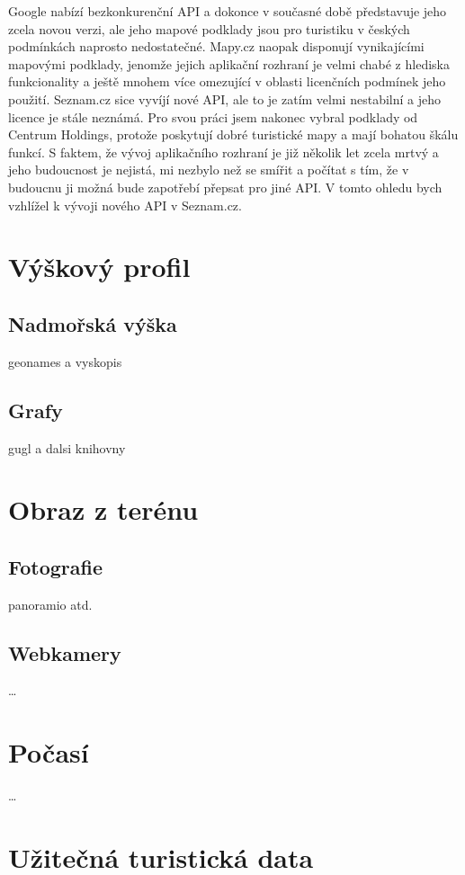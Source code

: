 Google nabízí bezkonkurenční API a dokonce v současné době
představuje jeho zcela novou verzi, ale jeho mapové podklady jsou pro turistiku v
českých podmínkách naprosto nedostatečné. Mapy.cz naopak disponují
vynikajícími mapovými podklady, jenomže jejich aplikační rozhraní je
velmi chabé z hlediska funkcionality a ještě mnohem více omezující v
oblasti licenčních podmínek jeho použití. Seznam.cz sice vyvíjí nové
API, ale to je zatím velmi nestabilní a jeho licence je stále
neznámá. Pro svou práci jsem nakonec vybral podklady od Centrum
Holdings, protože poskytují dobré turistické mapy a mají bohatou
škálu funkcí. S faktem, že vývoj aplikačního rozhraní je již několik
let zcela mrtvý a jeho budoucnost je nejistá, mi nezbylo než se
smířit a počítat s tím, že v budoucnu ji možná bude zapotřebí přepsat
pro jiné API. V tomto ohledu bych vzhlížel k vývoji nového API v Seznam.cz.




\section{Výškový profil}
\subsection{Nadmořská výška}
geonames a vyskopis
\subsection{Grafy}
gugl a dalsi knihovny

\section{Obraz z terénu}
\subsection{Fotografie}
panoramio atd.
\subsection{Webkamery}
\ldots

\section{Počasí}
\ldots

\section{Užitečná turistická data}
